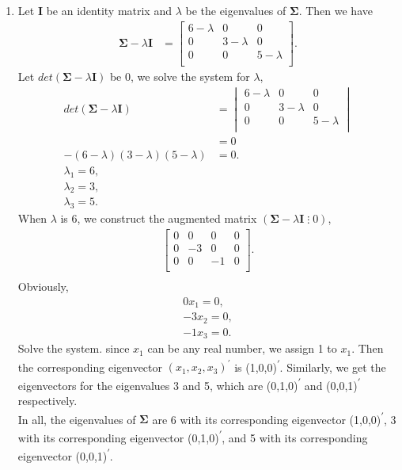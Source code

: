 \documentclass[10pt]{article}
\begin{document}
\begin{enumerate}[1)]
\item
Let \textbf{I} be an identity matrix and $\lambda$ be the eigenvalues of $\pmb{\Sigma}$. Then we have
\begin{align*}
\pmb{\Sigma}-\lambda\textbf{I}&=
  \begin{bmatrix}
    6-\lambda & 0 & 0\\
    0 & 3-\lambda & 0\\
    0 & 0 & 5-\lambda\\
  \end{bmatrix}
.
\end{align*}
Let $det(\pmb{\Sigma}-\lambda\textbf{I})$ be 0, we solve the system for $\lambda$,
\begin{align*}
det(\pmb{\Sigma}-\lambda\textbf{I})&=
  \begin{vmatrix}
    6-\lambda & 0 & 0\\
    0 & 3-\lambda & 0\\
    0 & 0 & 5-\lambda\\
  \end{vmatrix}
\\
&=0\\
-(6-\lambda)(3-\lambda)(5-\lambda)&=0.\\
\lambda_1=6,\\
\lambda_2=3,\\
\lambda_3=5.
\end{align*}
When $\lambda$ is 6, we construct the augmented matrix $(\pmb{\Sigma}-\lambda \textbf{I}\;\vdots\;0)$,
\begin{align*}
  \begin{bmatrix}
    0 & 0 & 0 & 0\\
    0 & -3 & 0 & 0\\
    0 & 0 & -1 & 0\\
  \end{bmatrix}
.\\
\end{align*}
Obviously,
\begin{align*}
0x_1=0,\\
-3x_2=0,\\
-1x_3=0.
\end{align*}
Solve the system. since $x_1$ can be any real number, we assign 1 to $x_1$. Then the corresponding eigenvector $(x_1,x_2,x_3)^{\prime}$ is (1,0,0)\textsuperscript{$\prime$}. Similarly, we get the eigenvectors for the eigenvalues 3 and 5, which are (0,1,0)\textsuperscript{$\prime$} and (0,0,1)\textsuperscript{$\prime$} respectively.\\
In all, the eigenvalues of $\pmb{\Sigma}$ are 6 with its corresponding eigenvector (1,0,0)\textsuperscript{$\prime$}, 3 with its corresponding eigenvector (0,1,0)\textsuperscript{$\prime$}, and 5 with its corresponding eigenvector (0,0,1)\textsuperscript{$\prime$}.
\vspace{3mm}


\end{enumerate}
\end{document}
